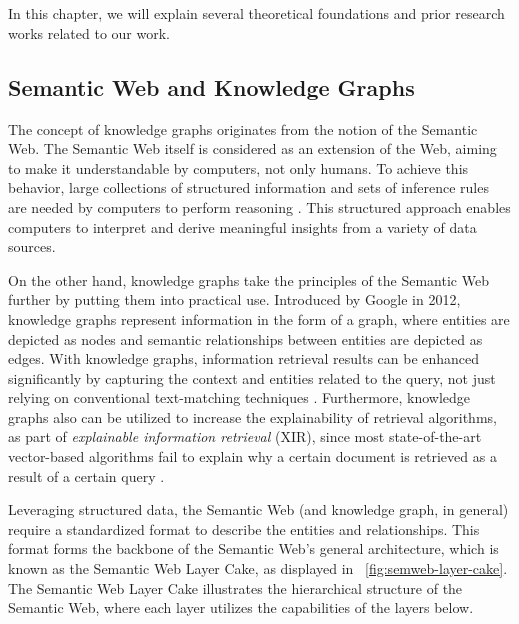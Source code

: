 \chapter{\babDua}
\label{bab:2}
In this chapter, we will explain several theoretical foundations and prior research works related to our work.

\section{Semantic Web and Knowledge Graphs}
\label{sec:kg}
The concept of knowledge graphs originates from the notion of the Semantic Web. The Semantic Web itself is considered as an extension of the Web, aiming to make it understandable by computers, not only humans. To achieve this behavior, large collections of structured information and sets of inference rules are needed by computers to perform reasoning \citep{semweb2001}. This structured approach enables computers to interpret and derive meaningful insights from a variety of data sources. 

On the other hand, knowledge graphs take the principles of the Semantic Web further by putting them into practical use. Introduced by Google in 2012, knowledge graphs represent information in the form of a graph, where entities are depicted as nodes and semantic relationships between entities are depicted as edges. With knowledge graphs, information retrieval results can be enhanced significantly by capturing the context and entities related to the query, not just relying on conventional text-matching techniques \citep{kg2012}. Furthermore, knowledge graphs also can be utilized to increase the explainability of retrieval algorithms, as part of \textit{explainable information retrieval} (XIR), since most state-of-the-art vector-based algorithms fail to explain why a certain document is retrieved as a result of a certain query \citep{xir2023}.

Leveraging structured data, the Semantic Web (and knowledge graph, in general) require a standardized format to describe the entities and relationships. This format forms the backbone of the Semantic Web's general architecture, which is known as the Semantic Web Layer Cake, as displayed in \pic~\ref{fig:semweb-layer-cake}. The Semantic Web Layer Cake illustrates the hierarchical structure of the Semantic Web, where each layer utilizes the capabilities of the layers below.

